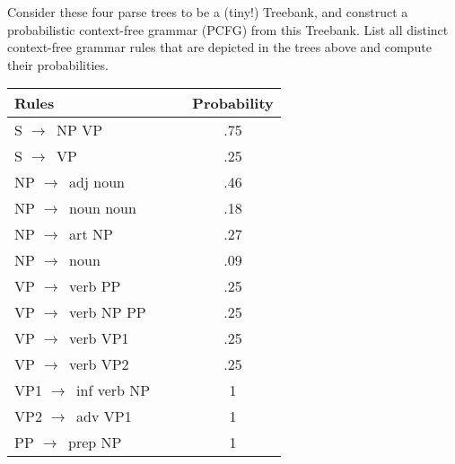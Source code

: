 \documentclass[11pt]{article}
\newcommand{\ra}{$\rightarrow$~}
\begin{document}
\begin{enumerate}
\begin{figure}[h]
\begin{minipage}[b]{0.5\linewidth}
\end{minipage}
\end{figure}

\begin{figure}[h]
\begin{minipage}[b]{0.5\linewidth}
\centering

\end{minipage}
\begin{minipage}[b]{0.5\linewidth}
\centering

\end{minipage}
\end{figure}

\begin{figure}[h]	
\begin{minipage}[b]{0.5\linewidth}
\centering

\end{minipage}
\begin{minipage}[b]{0.5\linewidth}
\centering

\end{minipage}
\end{figure}

Consider these four parse trees to be a (tiny!) Treebank, and construct a
probabilistic context-free grammar (PCFG) from this Treebank. 
List all distinct context-free grammar rules that are depicted in the
trees above and compute their probabilities.

\begin{center}
	\begin{tabular}{l@{\hskip 1in}c} 
	 \textbf{Rules~~~~~~~~~~~~~~~} & \textbf{Probability} \\ \hline 
	 S \ra NP VP & .75 \\
	 S \ra VP & .25 \\
	 NP \ra adj noun & .46 \\
	 NP \ra noun noun & .18 \\
	 NP \ra art NP & .27 \\
	 NP \ra noun & .09 \\
	 VP \ra verb PP & .25 \\
	 VP \ra verb NP PP & .25 \\
	 VP \ra verb VP1 & .25 \\
	 VP \ra verb VP2 & .25 \\
	 VP1 \ra inf verb NP & 1 \\
	 VP2 \ra adv VP1 & 1 \\
	 PP \ra prep NP & 1
 \end{tabular}
\end{center}




\end{enumerate}
\end{document}

